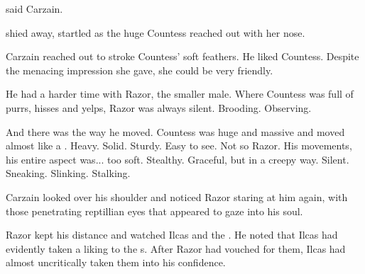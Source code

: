  said Carzain. 

\Roanne{} shied away, startled as the huge Countess reached out with her nose. 

Carzain reached out to stroke Countess' soft feathers. 
He liked Countess. 
Despite the menacing impression she gave, she could be very friendly. 

He had a harder time with Razor, the smaller male. 
Where Countess was full of purrs, hisses and yelps, Razor was always silent. 
Brooding. 
Observing. 

And there was the way he moved. 
Countess was huge and massive and moved almost like a \relc. 
Heavy. 
Solid. 
Sturdy. 
Easy to see. 
Not so Razor. 
His movements, his entire aspect was... too soft. 
Stealthy. 
Graceful, but in a creepy way. 
Silent. 
Sneaking. 
Slinking. 
Stalking. 

Carzain looked over his shoulder and noticed Razor staring at him again, with those penetrating reptillian eyes that appeared to gaze into his soul. 







\begin{comment}
\subsection{Razor broods some more}
\end{comment}

\new
Razor kept his distance and watched Ilcas and the \humans. 
He noted that Ilcas had evidently taken a liking to the \Shireyo s. 
After Razor had vouched for them, Ilcas had almost uncritically taken them into his confidence. 


